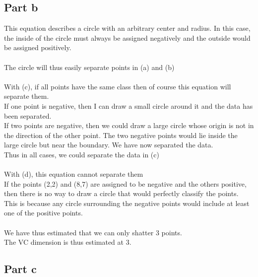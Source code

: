 \documentclass[twoside,11pt]{article}
\theoremstyle{definition}
\begin{document}
\subsection*{Part b}

This equation describes a circle with an arbitrary center and radius. In this case, the inside of the circle must always be assigned negatively and the outside would be assigned positively.\\
\\
The circle will thus easily separate points in (a) and (b)\\
\\
With (c), if all points have the same class then of course this equation will separate them. \\
If one point is negative, then I can draw a small circle around it and the data has been separated. \\
If two points are negative, then we could draw a large circle whose origin is not in the direction of the other point. The two negative points would lie inside the large circle but near the boundary. We have now separated the data.\\
Thus in all cases, we could separate the data in (c)\\
\\
With (d), this equation cannot separate them\\
If the points (2,2) and (8,7) are assigned to be negative and the others positive, then there is no way to draw a circle that would perfectly classify the points. This is because any circle surrounding the negative points would include at least one of the positive points. \\
\\
We have thus estimated that we can only shatter 3 points.\\
The VC dimension is thus estimated at 3.
\newpage
\subsection*{Part c}
\end{document}
